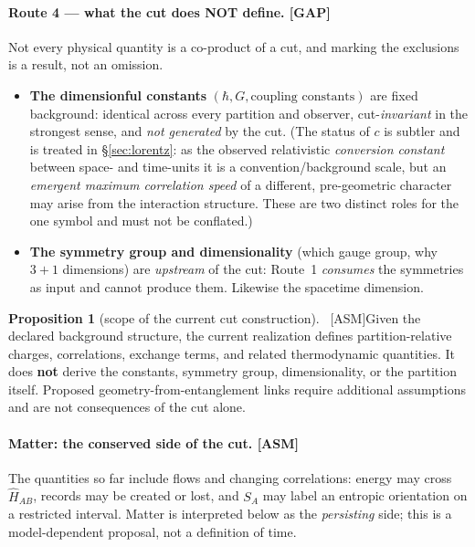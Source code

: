 \documentclass[11pt]{article}
\newcommand{\asm}{\textcolor{blue!70!black}{\textsf{\small[ASM]}}}
\newcommand{\gap}{\textcolor{red!75!black}{\textsf{\small[GAP]}}}
\theoremstyle{definition}
\newtheorem{proposition}{Proposition}[section]
\theoremstyle{remark}
\begin{document}
\paragraph{Route 4 --- what the cut does NOT define. \gap}
Not every physical quantity is a co-product of a cut, and marking the exclusions is a result, not an omission.
\begin{itemize}[leftmargin=1.4em, itemsep=2pt, topsep=2pt]
  \item \textbf{The dimensionful constants} $(\hbar, G, \text{coupling constants})$ are fixed background: identical across every partition and observer, cut-\emph{invariant} in the strongest sense, and \emph{not generated} by the cut. (The status of $c$ is subtler and is treated in \S\ref{sec:lorentz}: as the observed relativistic \emph{conversion constant} between space- and time-units it is a convention/background scale, but an \emph{emergent maximum correlation speed} of a different, pre-geometric character may arise from the interaction structure. These are two distinct roles for the one symbol and must not be conflated.)
  \item \textbf{The symmetry group and dimensionality} (which gauge group, why $3{+}1$ dimensions) are \emph{upstream} of the cut: Route~1 \emph{consumes} the symmetries as input and cannot produce them. Likewise the spacetime dimension.
\end{itemize}

\begin{proposition}[scope of the current cut construction]{\normalfont\ \asm}\label{prop:typebound}
Given the declared background structure, the current realization defines partition-relative charges, correlations, exchange terms, and related thermodynamic quantities. It does \textbf{not} derive the constants, symmetry group, dimensionality, or the partition itself. Proposed geometry-from-entanglement links require additional assumptions and are not consequences of the cut alone.
\end{proposition}

\paragraph{Matter: the conserved side of the cut. \asm}
The quantities so far include flows and changing correlations: energy may cross $\hat{H}_{AB}$, records may be created or lost, and $S_A$ may label an entropic orientation on a restricted interval. Matter is interpreted below as the \emph{persisting} side; this is a model-dependent proposal, not a definition of time.
\end{document}
